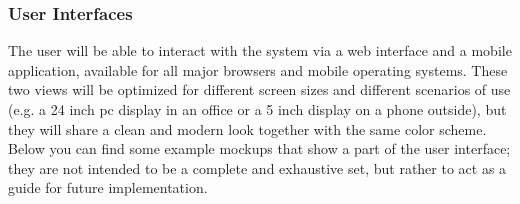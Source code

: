 \subsubsection{User Interfaces}

The user will be able to interact with the system via a web interface and a mobile application, available for all major browsers and mobile operating systems. These two views will be optimized for different screen sizes and different scenarios of use (e.g. a 24 inch pc display in an office or a 5 inch display on a phone outside), but they will share a clean and modern look together with the same color scheme.
\\ [0.2 cm]
Below you can find some example mockups that show a part of the user interface; they are not intended to be a complete and exhaustive set, but rather to act as a guide for future implementation.
\\ [0.5 cm]

